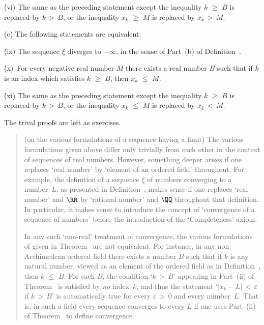 {\VA

        \h (vi) The same as the preceding statement except the inequality $k\,\,{\geq}\,\,B$ is replaced by $k\,>\,B$,
    or the inequality $x_{k}\,\,{\geq}\,\,M$ is replaced by $x_{k}\,>\,M$.

\V

        (c) The following statements are equivalent:

\V

        \h (ix) The sequence ${\xi}$ diverges to $-{\infty}$, in the sense of Part~(b) of Definition~.

\VA

        \h (x)\, For every negative real number $M$ there exists a real number $B$ such that if $k$ is an index which satisfies $k\,\,{\geq}\,\,B$,
    then $x_{k}\,\,{\leq}\,\,M$.

\VA

        \h (xi) The same as the preceding statement except the inequality $k\,\,{\geq}\,\,B$ is replaced by $k\,>\,B$,
    or the inequality $x_{k}\,\,{\leq}\,\,M$ is replaced by $x_{k}\,<\,M$.

\V

        The trival proofs are left as exercises.

\VV

\begin{quotation}
{\footnotesize \underline{\Note} (on the various formulations of a sequence having a limit)
        The various formulations given above differ only trivially from each other in the context of sequences of real numbers.
    However, something deeper arises if one replaces `real number' by `element of an ordered field' throughout.
    For example, the definition of a sequence ${\xi}$ of numbers converging to a number~$L$, as presented in Definition~,
    makes sense if one replaces `real number' and ${\RR}$ by `rational number' and ${\QQ}$ throughout that definition.
    In particular, it makes sense to introduce the concept of `convergence of a sequence of numbers' before the introduction of the `Completeness' axiom.


        In any such `non-real' treatment of convergence, the various formulations of given in Theorem~ are not equivalent.
    For instance, in any non-Archimedean ordered field there exists a number $B$ such that if $k$ is any natural number,
    viewed as an element of the ordered field as in Definition~, then $k\,\,{\leq}\,\,B$.
    For such $B$, the condition `$k\,>\,B$' appearing in Part~(ii) of Theorem~ is satisfied by {\em no} index~$k$, and thus the statement
    `$|x_{k}-L|\,<\,{\varepsilon}$ if $k\,>\,B$' is automatically true for every ${\varepsilon}\,>\,0$ and every number~$L$.
    That is, in such a field every sequence converges to every $L$ if one uses Part~(ii) of Theorem~ to define convergence.
}%
\end{quotation}
}%

